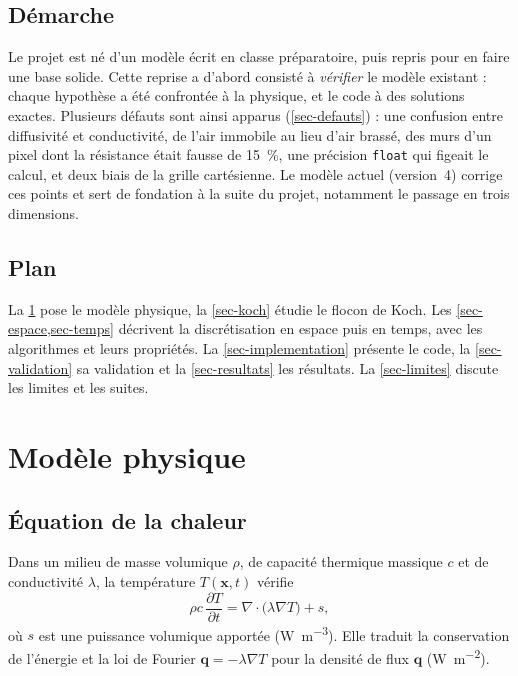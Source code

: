 \documentclass[11pt,a4paper]{article}
\theoremstyle{definition}
\theoremstyle{remark}
\begin{document}
\begin{center}
\end{center}

\subsection{Démarche}

Le projet est né d'un modèle écrit en classe préparatoire, puis repris pour en faire
une base solide. Cette reprise a d'abord consisté à \emph{vérifier} le modèle
existant : chaque hypothèse a été confrontée à la physique, et le code à des
solutions exactes. Plusieurs défauts sont ainsi apparus (\cref{sec-defauts}) : une
confusion entre diffusivité et conductivité, de l'air immobile au lieu d'air brassé,
des murs d'un pixel dont la résistance était fausse de \qty{15}{\percent}, une
précision \texttt{float} qui figeait le calcul, et deux biais de la grille
cartésienne. Le modèle actuel (version~4) corrige ces points et sert de fondation à
la suite du projet, notamment le passage en trois dimensions.

\subsection{Plan}

La \cref{sec-physique} pose le modèle physique, la \cref{sec-koch} étudie le flocon
de Koch. Les \cref{sec-espace,sec-temps} décrivent la discrétisation en espace puis
en temps, avec les algorithmes et leurs propriétés. La \cref{sec-implementation}
présente le code, la \cref{sec-validation} sa validation et la
\cref{sec-resultats} les résultats. La \cref{sec-limites} discute les limites et les
suites.

\section{Modèle physique}\label{sec-physique}

\subsection{Équation de la chaleur}

Dans un milieu de masse volumique $\rho$, de capacité thermique massique $c$ et de
conductivité $\lambda$, la température $T(\mathbf{x},t)$ vérifie
\begin{equation}\label{eq-chaleur}
\rho c\,\frac{\partial T}{\partial t} = \nabla\cdot\big(\lambda\nabla T\big) + s,
\end{equation}
où $s$ est une puissance volumique apportée (\unit{\watt\per\cubic\metre}). Elle
traduit la conservation de l'énergie et la loi de Fourier $\mathbf{q}=-\lambda\nabla T$
pour la densité de flux $\mathbf{q}$ (\unit{\watt\per\square\metre}).
\end{document}
